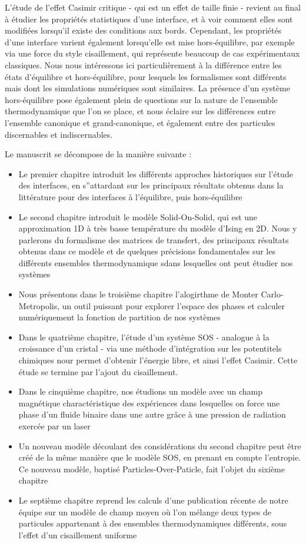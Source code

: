 L'étude de l'effet Casimir critique - qui est un effet de taille finie - revient au final à étudier les propriétés statistiques d'une interface, et à voir comment elles sont modifiées lorsqu'il existe des conditions aux bords. Cependant, les propriétés d'une interface varient également lorsqu'elle est mise hors-équilibre, par exemple via une force du style cisaillement, qui représente beaucoup de cas expérimentaux classiques. 
Nous nous intéressons ici particulièrement à la différence entre les états d'équilibre et hors-équilibre, pour lesquels les formalismes sont différents mais dont les simulations numériques sont similaires. La présence d'un système hors-équilibre pose également plein de questions sur la nature de l'ensemble thermodynamique que l'on se place, et nous éclaire sur les différences entre l'ensemble canonique et grand-canonique, et également entre des particules discernables et indiscernables.

Le manuscrit se décompose de la manière suivante :
\begin{itemize}
    \item Le premier chapitre introduit les différents approches historiques sur l'étude des interfaces, en s''attardant sur les principaux résultats obtenus dans la littérature pour des interfaces à l'équilibre, puis hors-équilibre
    \item Le second chapitre introduit le modèle Solid-On-Solid, qui est une approximation 1D à très basse température du modèle d'Ising en 2D. Nous y parlerons du formalisme des matrices de transfert, des principaux résultats obtenus dans ce modèle et de quelques précisions fondamentales sur les différents ensembles thermodynamique sdans lesquelles ont peut étudier nos systèmes
    \item Nous présentons dans le troisième chapitre l'alogirthme de Monter Carlo-Metropolis, un outil puissant pour explorer l'espace des phases et calculer numériquement la fonction de partition de nos systèmes
    \item Dans le quatrième chapitre, l'étude d'un système SOS - analogue à la croissance d'un cristal -  via une méthode d'intégration sur les potentitels chimiques nour permet d'obtenir l'énergie libre, et ainsi l'effet Casimir. Cette étude se termine par l'ajout du cisaillement.
        \item Dans le cinquième chapitre, nos étudions un modèle avec un champ magnétique charactéristique des expériences dans lesquelles on force une phase d'un fluide binaire dans une autre grâce à une pression de radiation exercée par un laser
    \item Un nouveau modèle découlant des considérations du second chapitre peut être créé de la même manière que le modèle SOS, en prenant en compte l'entropie. Ce nouveau modèle, baptisé Particles-Over-Paticle, fait l'objet du sixième chapitre
    \item Le septième chapitre reprend les calculs d'une publication récente de notre équipe sur un modèle de champ moyen où l'on mélange deux types de particules appartenant à des ensembles thermodynamiques différents, sous l'effet d'un cisaillement uniforme
\end{itemize}

